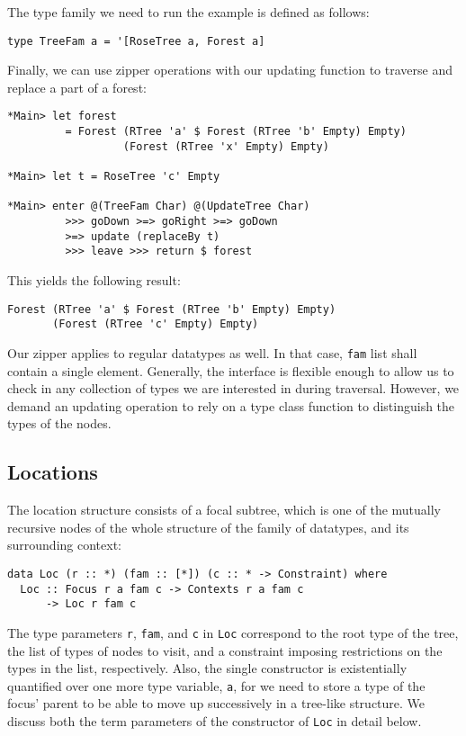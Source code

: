 \documentclass[runningheads]{llncs}
\newcommand{\K}[1]{\lstinline{#1}}
\begin{document}
The type family we need to run the example is defined as follows:
\begin{lstlisting}
type TreeFam a = '[RoseTree a, Forest a]
\end{lstlisting}

Finally, we can use zipper operations with our updating function to traverse and replace a part of a forest:
\begin{lstlisting}
*Main> let forest
         = Forest (RTree 'a' $ Forest (RTree 'b' Empty) Empty)
                  (Forest (RTree 'x' Empty) Empty)

*Main> let t = RoseTree 'c' Empty

*Main> enter @(TreeFam Char) @(UpdateTree Char)
         >>> goDown >=> goRight >=> goDown
         >=> update (replaceBy t)
         >>> leave >>> return $ forest
\end{lstlisting}
This yields the following result:
\begin{lstlisting}
Forest (RTree 'a' $ Forest (RTree 'b' Empty) Empty)
       (Forest (RTree 'c' Empty) Empty)
\end{lstlisting}

Our zipper applies to regular datatypes as well. In that case, \K{fam} list shall contain a single element. Generally, the interface is flexible enough to allow us to check in any collection of types we are interested in during traversal. However, we demand an updating operation to rely on a type class function to distinguish the types of the nodes.

\subsection{Locations}
\label{ss:locs}

The location structure consists of a focal subtree, which is one of the mutually recursive nodes of the whole structure of the family of datatypes, and its surrounding context:
\begin{lstlisting}
data Loc (r :: *) (fam :: [*]) (c :: * -> Constraint) where
  Loc :: Focus r a fam c -> Contexts r a fam c
      -> Loc r fam c
\end{lstlisting}
The type parameters \K{r}, \K{fam}, and \K{c} in \K{Loc} correspond to the root type of the tree, the list of types of nodes to visit, and a constraint imposing restrictions on the types in the list, respectively. Also, the single constructor is existentially quantified over one more type variable, \K{a}, for we need to store a type of the focus' parent to be able to move up successively in a tree-like structure. We discuss both the term parameters of the constructor of \K{Loc} in detail below. 
\end{document}
